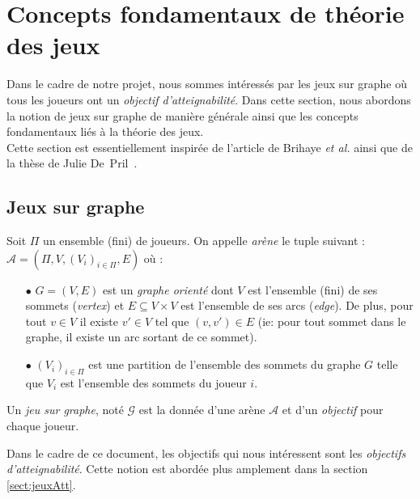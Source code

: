 
\section{Concepts fondamentaux de théorie des jeux}
Dans le cadre de notre projet, nous sommes intéressés par les jeux sur graphe où tous les joueurs ont un \textit{objectif d'atteignabilité}.
Dans cette section, nous abordons la notion de jeux sur graphe de manière générale ainsi que les concepts fondamentaux liés à la théorie des jeux.\\
Cette section est essentiellement inspirée de l'article de Brihaye \emph{et al.} \cite{DBLP:conf/lfcs/BrihayePS13} ainsi que de la thèse de Julie De~Pril~\cite{juliePhd}.

\subsection{Jeux sur graphe}




\begin{defi}[Arène]
	Soit $\Pi$ un ensemble (fini) de joueurs. On appelle \textit{arène} le tuple suivant :\\
	 $\mathcal{A} = (\Pi,V , (V_{i})_{i\in{\Pi}}, E )$ où :
	\begin{enumerate}
		\item[$\bullet$] $G = (V,E)$ est un \textit{graphe orienté}  dont $V$ est l'ensemble (fini) de ses sommets (\textit{vertex}) et $E \subseteq V \times V$ est l'ensemble de ses arcs (\textit{edge}). De plus, pour tout $ v\in V $ il existe $v'\in V$ tel que $(v,v') \in E$ (ie: pour tout sommet dans le graphe, il existe un arc sortant de ce sommet).
		\item[$\bullet$] $(V_{i})_{i\in\Pi}$ est une partition de l'ensemble des sommets du graphe $G$ telle que $V_{i}$ est l'ensemble des sommets du joueur $i$.
	\end{enumerate}
\end{defi}


\begin{defi}
	Un \textit{jeu sur graphe}, noté $\mathcal{G}$ est la donnée d'une arène $\mathcal{A}$ et d'un \textit{objectif} pour chaque joueur.
\end{defi}

\begin{rem}
	Dans le cadre de ce document, les objectifs qui nous intéressent sont les \textit{objectifs d'atteignabilité}. Cette notion est abordée plus amplement dans la section \ref{sect:jeuxAtt}.
\end{rem}


